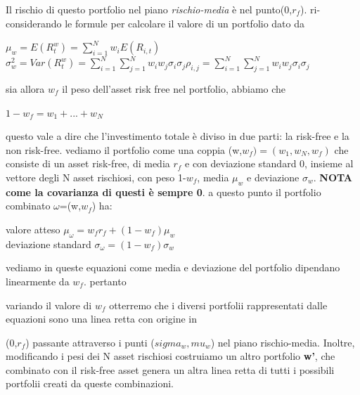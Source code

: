 \documentclass[a4paper,11pt]{report}
\begin{document}
{	Il rischio di questo portfolio nel piano \emph{rischio-media} è nel punto(0,$r_f$).
	ri-considerando le formule per calcolare il valore di un portfolio dato da
\begin{center}
	$\mu_w = E(R_t^w) =  \sum\limits_{i=1}^N w_i E(R_{i,t}) $ 
	$\sigma_w^2 = Var(R_t^w) =  \sum\limits_{i=1}^N  \sum\limits_{j=1}^N w_i w_j \sigma_i \sigma_j \rho_{i,j} =  \sum		\limits_{i=1}^N  \sum\limits_{j=1}^N w_i w_j \sigma_i \sigma_j  $ 
\end{center}
	sia allora $w_f$ il peso dell'asset risk free nel portfolio, abbiamo che
\begin{center}
$	1-w_f=w_1+...+w_N$
\end{center}
	questo vale a dire che l'investimento totale è diviso in due parti: la risk-free e la non risk-free.
	vediamo il portfolio come una coppia (w,$w_f)=(w_1,w_N,w_f) $ che consiste di un asset risk-free, di media $r_f$
	e con deviazione standard 0, insieme al vettore degli N asset rischiosi, con peso 1-$w_f$, media $\mu_w$ e deviazione $			\sigma_w$. \newline
	\textbf{NOTA come la covarianza di questi è sempre 0}. \newline
	a questo punto il portfolio combinato $\omega$=(w,$w_f$) ha:
\begin{center}
	valore atteso $\mu_\omega = w_f r_f+(1-w_f)\mu_w $ \\
	deviazione standard $\sigma_\omega = (1-w_f) \sigma_w$
\end{center}

	vediamo in queste equazioni come media e deviazione del portfolio dipendano linearmente da $w_f$. pertanto

	variando il valore di $w_f$ otterremo che i diversi portfolii rappresentati dalle equazioni sono una linea retta con origine in

	(0,$r_f$) passante attraverso i punti ($sigma_w,mu_w$) nel piano rischio-media. \newline
	Inoltre, modificando i pesi dei N asset rischiosi costruiamo un altro portfolio \textbf{w'},  che combinato con il risk-free asset
	genera un altra linea retta di tutti i possibili portfolii creati da queste combinazioni. \newline

}
\end{document}
